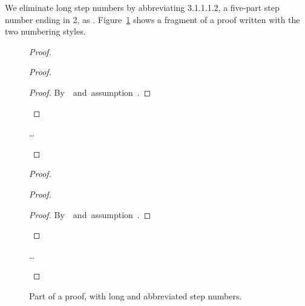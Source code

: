 We eliminate long step numbers by abbreviating 3.1.1.1.2, a five-part
step number ending in 2, as .
Figure~\ref{fig:pf-part} shows a fragment of a proof written with the
two numbering styles.
\begin{figure}
\pfshortindent
\centering
\begin{minipage}{.5\textwidth}
\small
\begin{proof}
\begin{noproof}
\begin{noproof}
\begin{noproof}
\begin{proof}
\qedstep %
\begin{proof}
By~~and~assumption~.
\end{proof}
\end{proof} %
\ldots
\end{noproof} %
\end{noproof} %
\end{noproof} %
\end{proof}
\end{minipage}%
\hspace{.1\textwidth}%
\begin{minipage}{.4\textwidth}
\small
\begin{proof}
\begin{noproof}
\begin{noproof}
\begin{noproof}
\begin{proof}
\qedstep %
\begin{proof}
By~~and~assumption~.
\end{proof}
\end{proof} %
\ldots
\end{noproof} %
\end{noproof} %
\end{noproof} %
\end{proof}
\end{minipage}%
\caption{Part of a proof, with long and abbreviated step numbers.}
\label{fig:pf-part}
\end{figure}
